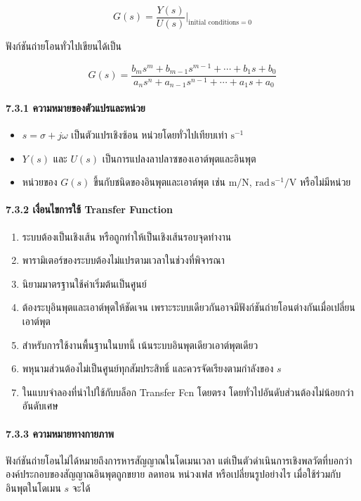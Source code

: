 \[
G(s)=\frac{Y(s)}{U(s)}\bigg|_{\text{initial conditions}=0}
\]

ฟังก์ชันถ่ายโอนทั่วไปเขียนได้เป็น

\[
G(s)=\frac{b_ms^m+b_{m-1}s^{m-1}+\cdots+b_1s+b_0}
{a_ns^n+a_{n-1}s^{n-1}+\cdots+a_1s+a_0}
\]

\paragraph{7.3.1 ความหมายของตัวแปรและหน่วย}

\begin{itemize}
    \item $s=\sigma+j\omega$ เป็นตัวแปรเชิงซ้อน หน่วยโดยทั่วไปเทียบเท่า $\text{s}^{-1}$
    \item $Y(s)$ และ $U(s)$ เป็นการแปลงลาปลาซของเอาต์พุตและอินพุต
    \item หน่วยของ $G(s)$ ขึ้นกับชนิดของอินพุตและเอาต์พุต เช่น $\text{m/N}$, $\text{rad}\,\text{s}^{-1}\text{/V}$ หรือไม่มีหน่วย
\end{itemize}

\paragraph{7.3.2 เงื่อนไขการใช้ Transfer Function}

\begin{enumerate}
    \item ระบบต้องเป็นเชิงเส้น หรือถูกทำให้เป็นเชิงเส้นรอบจุดทำงาน
    \item พารามิเตอร์ของระบบต้องไม่แปรตามเวลาในช่วงที่พิจารณา
    \item นิยามมาตรฐานใช้ค่าเริ่มต้นเป็นศูนย์
    \item ต้องระบุอินพุตและเอาต์พุตให้ชัดเจน เพราะระบบเดียวกันอาจมีฟังก์ชันถ่ายโอนต่างกันเมื่อเปลี่ยนเอาต์พุต
    \item สำหรับการใช้งานพื้นฐานในบทนี้ เน้นระบบอินพุตเดียวเอาต์พุตเดียว
    \item พหุนามส่วนต้องไม่เป็นศูนย์ทุกสัมประสิทธิ์ และควรจัดเรียงตามกำลังของ $s$
    \item ในแบบจำลองที่นำไปใช้กับบล็อก Transfer Fcn โดยตรง โดยทั่วไปอันดับส่วนต้องไม่น้อยกว่าอันดับเศษ
\end{enumerate}

\paragraph{7.3.3 ความหมายทางกายภาพ}

ฟังก์ชันถ่ายโอนไม่ได้หมายถึงการหารสัญญาณในโดเมนเวลา แต่เป็นตัวดำเนินการเชิงพลวัตที่บอกว่าองค์ประกอบของสัญญาณอินพุตถูกขยาย ลดทอน หน่วงเฟส หรือเปลี่ยนรูปอย่างไร เมื่อใช้ร่วมกับอินพุตในโดเมน $s$ จะได้

